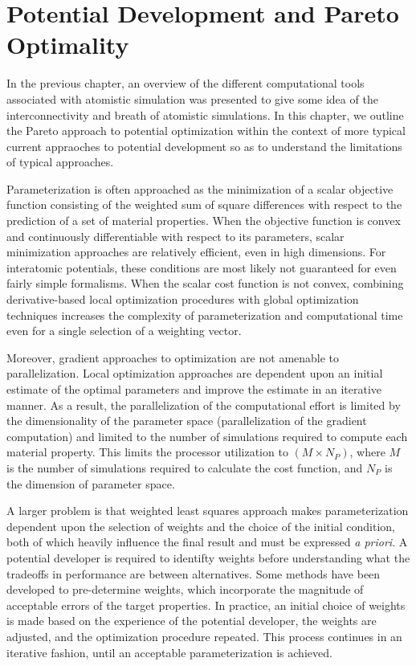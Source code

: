 \chapter{Potential Development and Pareto Optimality}
\label{ch:potential_development}

In the previous chapter, an overview of the different computational tools associated with atomistic simulation was presented to give some idea of the interconnectivity and breath of atomistic simulations.  In this chapter, we outline the Pareto approach to potential optimization within the context of more typical current appraoches to potential development so as to understand the limitations of typical approaches.

Parameterization is often approached as the minimization of a scalar objective function consisting of the weighted sum of square differences with respect to the prediction of a set of material properties.  When the objective function is convex and continuously differentiable with respect to its parameters, scalar minimization approaches are relatively efficient, even in high dimensions.  For interatomic potentials, these conditions are most likely not guaranteed for even fairly simple formalisms.  When the scalar cost function is not convex, combining derivative-based local optimization procedures with global optimization techniques increases the complexity of parameterization and computational time even for a single selection of a weighting vector.

Moreover, gradient approaches to optimization are not amenable to parallelization.  Local optimization approaches are dependent upon an initial estimate of the optimal parameters and improve the estimate in an iterative manner.  As a result, the parallelization of the computational effort is limited by the dimensionality of the parameter space (parallelization of the gradient computation) and limited to the number of simulations required to compute each material property.  This limits the processor utilization to $(M \times N_P)$, where $M$ is the number of simulations required to calculate the cost function, and $N_P$ is the dimension of parameter space.

A larger problem is that weighted least squares approach makes parameterization dependent upon the selection of weights and the choice of the initial condition, both of which heavily influence the final result and must be expressed \emph{a priori}. A potential developer is required to identifty weights before understanding what the tradeoffs in performance are between alternatives.  Some methods have been developed to pre-determine weights, which incorporate the magnitude of acceptable errors of the target properties\cite{martinez2013_fitting}.  In practice, an initial choice of weights is made based on the experience of the potential developer, the weights are adjusted, and the optimization procedure repeated.  This process continues in an iterative fashion, until an acceptable parameterization is achieved.

